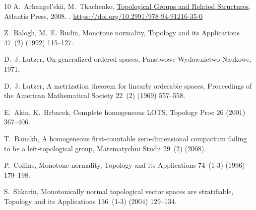 \documentclass[preprint]{elsarticle}
\theoremstyle{definition}
\theoremstyle{remark}
\begin{document}
\begin{thebibliography}{10}
A.~Arhangel'skii, M.~Tkachenko,
  \href{https://doi.org/10.2991/978-94-91216-35-0}{{Topological Groups and
  Related Structures}}, Atlantis Press, 2008.
\newblock \href {https://doi.org/10.2991/978-94-91216-35-0}
  {}.
\newline\urlprefix\url{https://doi.org/10.2991/978-94-91216-35-0}

Z.~Balogh, M.~E. Rudin, Monotone normality, Topology and its Applications
  47~(2) (1992) 115--127.

D.~J. Lutzer, On generalized ordered spaces, Panstwowe Wydawnictwo Naukowe,
  1971.

D.~J. Lutzer, A metrization theorem for linearly orderable spaces, Proceedings
  of the American Mathematical Society 22~(2) (1969) 557--558.

E.~Akin, K.~Hrbacek, {Complete homogeneous LOTS}, Topology Proc 26 (2001)
  367--406.

T.~Banakh, A homogeneous first-countable zero-dimensional compactum failing to
  be a left-topological group, Matematychni Studii 29~(2) (2008).

P.~Collins, Monotone normality, Topology and its Applications 74~(1-3) (1996)
  179--198.

S.~Shkarin, Monotonically normal topological vector spaces are stratifiable,
  Topology and its Applications 136~(1-3) (2004) 129--134.

\end{thebibliography}
\end{document}

